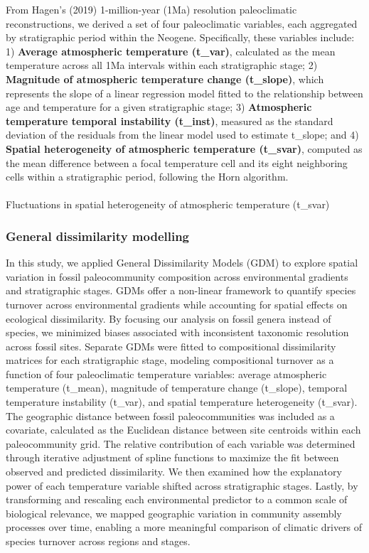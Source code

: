 \documentclass[
]{agujournal2019}
\makeatletter
\let\oldparagraph\paragraph
\renewcommand{\paragraph}{
    \@ifstar
      \xxxParagraphStar
      \xxxParagraphNoStar
  }
\newcommand{\xxxParagraphStar}[1]{\oldparagraph*{#1}\mbox{}}
\newcommand{\xxxParagraphNoStar}[1]{\oldparagraph{#1}\mbox{}}
\makeatother
\begin{document}
From Hagen's (2019) 1-million-year (1Ma) resolution paleoclimatic
reconstructions, we derived a set of four paleoclimatic variables, each
aggregated by stratigraphic period within the Neogene. Specifically,
these variables include: 1) \textbf{Average atmospheric temperature
(t\_var)}, calculated as the mean temperature across all 1Ma intervals
within each stratigraphic stage; 2) \textbf{Magnitude of atmospheric
temperature change (t\_slope)}, which represents the slope of a linear
regression model fitted to the relationship between age and temperature
for a given stratigraphic stage; 3) \textbf{Atmospheric temperature
temporal instability (t\_inst)}, measured as the standard deviation of
the residuals from the linear model used to estimate t\_slope; and 4)
\textbf{Spatial heterogeneity of atmospheric temperature (t\_svar)},
computed as the mean difference between a focal temperature cell and its
eight neighboring cells within a stratigraphic period, following the
Horn algorithm.

\paragraph{Fluctuations in spatial heterogeneity of atmospheric
temperature
(t\_svar)}\label{fluctuations-in-spatial-heterogeneity-of-atmospheric-temperature-t_svar}

\subsubsection{General dissimilarity
modelling}\label{general-dissimilarity-modelling}

In this study, we applied General Dissimilarity Models (GDM) to explore
spatial variation in fossil paleocommunity composition across
environmental gradients and stratigraphic stages. GDMs offer a
non-linear framework to quantify species turnover across environmental
gradients while accounting for spatial effects on ecological
dissimilarity. By focusing our analysis on fossil genera instead of
species, we minimized biases associated with inconsistent taxonomic
resolution across fossil sites. Separate GDMs were fitted to
compositional dissimilarity matrices for each stratigraphic stage,
modeling compositional turnover as a function of four paleoclimatic
temperature variables: average atmospheric temperature (t\_mean),
magnitude of temperature change (t\_slope), temporal temperature
instability (t\_var), and spatial temperature heterogeneity (t\_svar).
The geographic distance between fossil paleocommunities was included as
a covariate, calculated as the Euclidean distance between site centroids
within each paleocommunity grid. The relative contribution of each
variable was determined through iterative adjustment of spline functions
to maximize the fit between observed and predicted dissimilarity. We
then examined how the explanatory power of each temperature variable
shifted across stratigraphic stages. Lastly, by transforming and
rescaling each environmental predictor to a common scale of biological
relevance, we mapped geographic variation in community assembly
processes over time, enabling a more meaningful comparison of climatic
drivers of species turnover across regions and stages.
\end{document}
